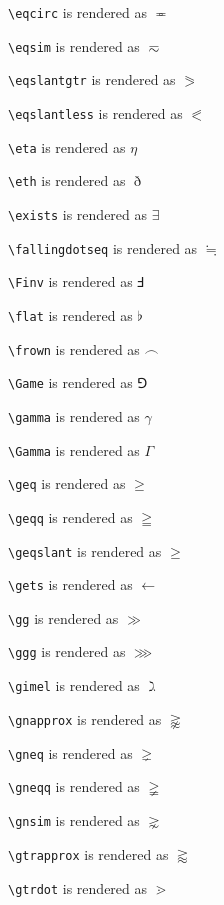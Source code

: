 \texttt{\textbackslash eqcirc} is rendered as $\eqcirc$


\texttt{\textbackslash eqsim} is rendered as $\eqsim$


\texttt{\textbackslash eqslantgtr} is rendered as $\eqslantgtr$


\texttt{\textbackslash eqslantless} is rendered as $\eqslantless$


\texttt{\textbackslash eta} is rendered as $\eta$


\texttt{\textbackslash eth} is rendered as $\eth$


\texttt{\textbackslash exists} is rendered as $\exists$


\texttt{\textbackslash fallingdotseq} is rendered as $\fallingdotseq$


\texttt{\textbackslash Finv} is rendered as $\Finv$


\texttt{\textbackslash flat} is rendered as $\flat$


\texttt{\textbackslash frown} is rendered as $\frown$


\texttt{\textbackslash Game} is rendered as $\Game$


\texttt{\textbackslash gamma} is rendered as $\gamma$


\texttt{\textbackslash Gamma} is rendered as $\Gamma$


\texttt{\textbackslash geq} is rendered as $\geq$


\texttt{\textbackslash geqq} is rendered as $\geqq$


\texttt{\textbackslash geqslant} is rendered as $\geqslant$


\texttt{\textbackslash gets} is rendered as $\gets$


\texttt{\textbackslash gg} is rendered as $\gg$


\texttt{\textbackslash ggg} is rendered as $\ggg$


\texttt{\textbackslash gimel} is rendered as $\gimel$


\texttt{\textbackslash gnapprox} is rendered as $\gnapprox$


\texttt{\textbackslash gneq} is rendered as $\gneq$


\texttt{\textbackslash gneqq} is rendered as $\gneqq$


\texttt{\textbackslash gnsim} is rendered as $\gnsim$


\texttt{\textbackslash gtrapprox} is rendered as $\gtrapprox$


\texttt{\textbackslash gtrdot} is rendered as $\gtrdot$


